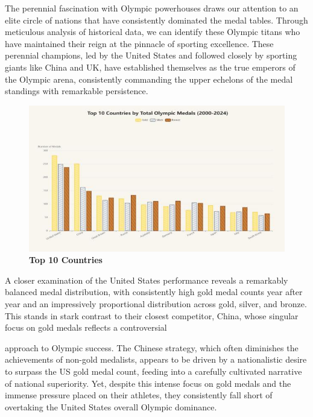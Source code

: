 \documentclass[12pt,a4paper]{article}
\begin{document}
    The perennial fascination with Olympic powerhouses draws our
    attention to an elite circle of nations that have consistently dominated
    the medal tables. Through meticulous analysis of historical data, we can
    identify these Olympic titans who have maintained their reign at the
    pinnacle of sporting excellence. These perennial champions, led by the
    United States and followed closely by sporting giants like China and UK,
    have established themselves as the true emperors of the Olympic arena,
    consistently commanding the upper echelons of the medal standings with
    remarkable persistence.
    
    \begin{figure}[htbp]
        \centering
        \includegraphics[width=\textwidth]{./media/media/image3.jpeg}
        \caption{\textbf{Top 10 Countries}}
        \label{fig:top10countries}
    \end{figure}
    
    
    A closer examination of the United States\textquotesingle{}
    performance reveals a remarkably balanced medal distribution, with
    consistently high gold medal counts year after year and an impressively
    proportional distribution across gold, silver, and bronze. This stands
    in stark contrast to their closest competitor, China, whose singular
    focus on gold medals reflects a controversial
    
    
    approach to Olympic success. The Chinese strategy, which often
    diminishes the achievements of non-gold medalists, appears to be driven
    by a nationalistic desire to surpass the US gold medal count, feeding
    into a carefully cultivated narrative of national superiority. Yet,
    despite this intense focus on gold medals and the immense pressure
    placed on their athletes, they consistently fall short of overtaking the
    United States\textquotesingle{} overall Olympic dominance.
    
\end{document}

